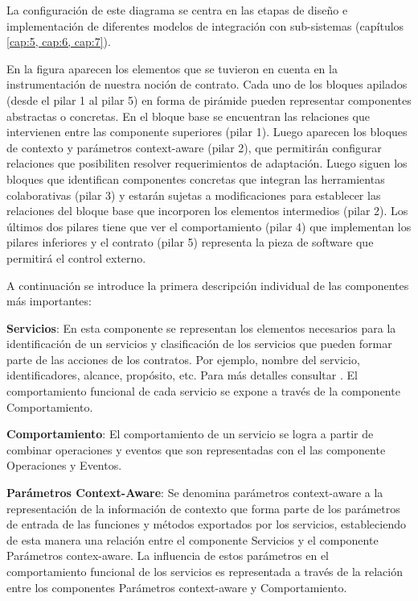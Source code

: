 {La configuración de este diagrama se centra en las etapas de diseño e
implementación de diferentes modelos de integración con sub-sistemas
(capítulos \ref{cap:5, cap:6, cap:7}). 


En la figura aparecen los elementos que se tuvieron en cuenta
en la instrumentación de nuestra noción de contrato. Cada uno de los bloques
apilados (desde el pilar 1 al pilar 5) en forma de pirámide pueden representar
componentes abstractas o concretas. En el bloque base se encuentran las
relaciones que  intervienen entre las componente superiores (pilar 1).  Luego
aparecen los bloques de contexto y parámetros context-aware (pilar 2), que
permitirán configurar relaciones que posibiliten resolver requerimientos de
adaptación. Luego siguen los bloques que identifican componentes concretas que
integran las herramientas colaborativas (pilar 3) y estarán sujetas a
modificaciones para establecer las relaciones del bloque base que incorporen los
elementos intermedios (pilar 2). Los últimos dos pilares tiene que ver el
comportamiento (pilar 4) que implementan los pilares inferiores y el contrato
(pilar 5) representa la pieza de software que permitirá el control externo. 


A continuación se introduce la primera descripción individual de las
componentes más importantes:

\textbf{Servicios}: En esta componente se representan los elementos necesarios
para la identificación de un servicios y clasificación de los servicios que
pueden formar parte de las acciones de los contratos. Por ejemplo, nombre del
servicio, identificadores, alcance, propósito, etc. Para más detalles
consultar \cite{cap1.5}. El comportamiento funcional de cada servicio se
expone a través de la componente Comportamiento.


\textbf{Comportamiento}: El comportamiento de un servicio se logra a partir de
combinar operaciones y eventos que son representadas con el las componente
Operaciones y Eventos. 


\textbf{Parámetros Context-Aware}: Se denomina parámetros context-aware a la
representación de la información de contexto que forma parte de los
parámetros de entrada de las funciones y métodos exportados por los servicios,
estableciendo de esta manera una relación entre el componente Servicios y el
componente Parámetros contex-aware. La influencia de estos parámetros en el
comportamiento funcional de los servicios es representada a través de
la relación entre los componentes Parámetros context-aware y Comportamiento.


}

